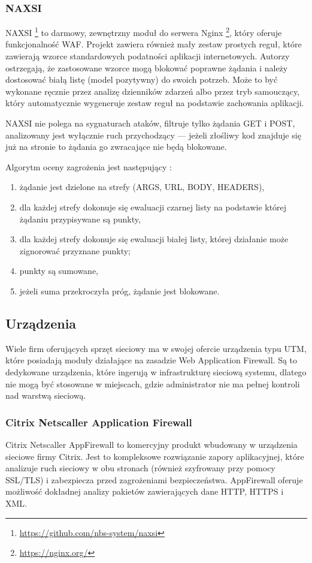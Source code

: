 \documentclass[11pt,a4paper,polish,thesis]{dcsbook}
\begin{document}
\subsubsection{NAXSI}
NAXSI \footnote{\url{https://github.com/nbs-system/naxsi}} to darmowy, zewnętrzny moduł do serwera Nginx \footnote{\url{https://nginx.org/}}, który oferuje funkcjonalność WAF. Projekt zawiera również mały zestaw prostych reguł, które zawierają wzorce standardowych podatności aplikacji internetowych. Autorzy ostrzegają, że zastosowane wzorce mogą blokować poprawne żądania i należy dostosować białą listę (model pozytywny) do swoich potrzeb. Może to być wykonane ręcznie przez analizę dzienników zdarzeń albo przez tryb samouczący, który automatycznie wygeneruje zestaw reguł na podstawie zachowania aplikacji.

NAXSI nie polega na sygnaturach ataków, filtruje tylko żądania GET i POST, analizowany jest wyłącznie ruch przychodzący --- jeżeli złośliwy kod znajduje się już na stronie to żądania go zwracające nie będą blokowane.

Algorytm oceny zagrożenia jest następujący \cite{naxsi-sekurak}:
\begin{enumerate}
\item żądanie jest dzielone na strefy (ARGS, URL, BODY, HEADERS),
\item dla każdej strefy dokonuje się ewaluacji czarnej listy na podstawie której żądaniu przypisywane są punkty,
\item dla każdej strefy dokonuje się ewaluacji białej listy, której działanie może zignorować przyznane punkty;
\item punkty są sumowane,
\item jeżeli suma przekroczyła próg, żądanie jest blokowane.
\end{enumerate}

\subsection{Urządzenia}
Wiele firm oferujących sprzęt sieciowy ma w swojej ofercie urządzenia typu UTM, które posiadają moduły działające na zasadzie Web Application Firewall. Są to dedykowane urządzenia, które ingerują w infrastrukturę sieciową systemu, dlatego nie mogą być stosowane w miejscach, gdzie administrator nie ma pełnej kontroli nad warstwą sieciową.

\subsubsection{Citrix Netscaller Application Firewall}
Citrix Netscaller AppFirewall \cite{citrix} to komercyjny produkt wbudowany w urządzenia sieciowe firmy Citrix. Jest to kompleksowe rozwiązanie zapory aplikacyjnej, które analizuje ruch sieciowy w obu stronach (również szyfrowany przy pomocy SSL/TLS) i zabezpiecza przed zagrożeniami bezpieczeństwa. AppFirewall oferuje możliwość dokładnej analizy pakietów zawierających dane HTTP, HTTPS i XML.
\end{document}
